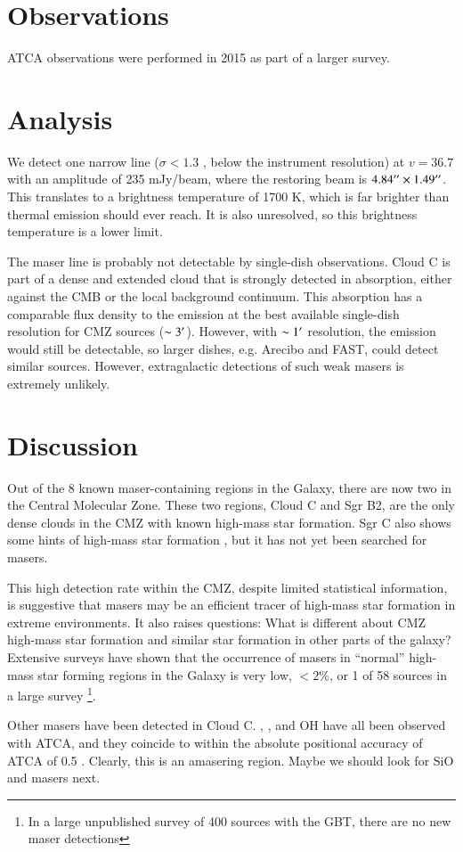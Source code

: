 \documentclass{aa}
\begin{document}
\section{Observations}
ATCA observations were performed in 2015 as part of a larger survey.

\section{Analysis}
We detect one narrow line ($\sigma<1.3$ \kms, below the instrument resolution)
at $v=36.7$ \kms with an amplitude of 235 mJy/beam, where the restoring beam is
$4.84\mbox{$^{\prime\prime}$}\times1.49\mbox{$^{\prime\prime}$}$.  This translates to a brightness temperature of
1700 K, which is far brighter than thermal \formaldehyde emission should ever
reach.  It is also unresolved, so this brightness temperature is a lower limit.

The maser line is probably not detectable by single-dish observations.  Cloud C
is part of a dense and extended cloud that is strongly detected in absorption,
either against the CMB or the local background continuum.  This absorption has
a comparable flux density to the emission at the best available single-dish resolution
for CMZ sources ($\sim3\mbox{$^\prime$}$).  However, with $\sim1\mbox{$^\prime$}$ resolution, the 
emission would still be detectable, so larger dishes, e.g. Arecibo and FAST,
could detect similar sources.  However, extragalactic detections of such weak
masers is extremely unlikely.

\section{Discussion}
Out of the 8 known maser-containing regions in the Galaxy, there are now two in
the Central Molecular Zone.  These two regions, Cloud C and Sgr B2, are the only
dense clouds in the CMZ with known high-mass star formation.  Sgr C also shows
some hints of high-mass star formation \citep{Kendrew2013a}, but it has not yet
been searched for \formaldehyde masers.

This high detection rate within the CMZ, despite limited statistical
information, is suggestive that \formaldehyde masers may be an efficient tracer
of high-mass star formation in extreme environments.
It also raises questions: What is different about CMZ high-mass star formation and
similar star formation in other parts of the galaxy?  Extensive surveys have shown
that the occurrence of \formaldehyde masers in ``normal'' high-mass star
forming regions in the Galaxy is very low, $<2\%$, or 1 of 58 sources in a
large survey \citep{Araya2004a,Araya2007b,Araya2008a}\footnote{In a large unpublished survey
of 400 sources with the GBT, there are no new maser detections}.  

Other masers have been detected in Cloud C.  \methanol, \water, and OH have all
been observed with ATCA, and they coincide to within the absolute positional
accuracy of ATCA of 0.5\arcsec
\citep[][respectively]{Caswell2010a,Walsh2014a,Argon2000a}.  Clearly, this is
an amasering region.  Maybe we should look for SiO and \ammonia masers next.

  
\end{document}
